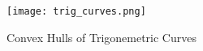 \documentclass[12]{amsart}
\begin{document}
\begin{figure}
    \centering
    \texttt{[image: trig\_curves.png]}
    \caption{Convex Hulls of Trigonemetric Curves}
\end{figure}

\nocite{*}
                                                    
                                                   
\end{document}
